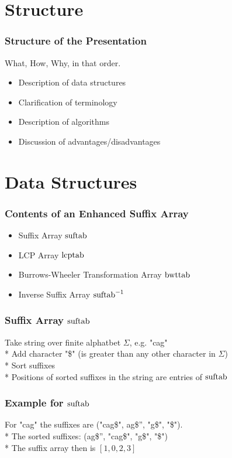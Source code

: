 \documentclass[compress,handout]{beamer} %
\begin{document}
\section{Structure}

\begin{frame}
	\frametitle{Structure of the Presentation}
	What, How, Why, in that order.
	\begin{itemize}
		\item Description of data structures
		\item Clarification of terminology
		\item Description of algorithms
		\item Discussion of advantages/disadvantages
	\end{itemize}
\end{frame}

\section{Data Structures}

\begin{frame}
	\frametitle{Contents of an Enhanced Suffix Array}
	\begin{itemize}
		\item Suffix Array $\hbox{suftab}$
		\item LCP Array $\hbox{lcptab}$
		\item Burrows-Wheeler Transformation Array $\hbox{bwttab}$
		\item Inverse Suffix Array $\hbox{suftab}^{-1}$
	\end{itemize}
\end{frame}

\begin{frame}
	\frametitle{Suffix Array $\hbox{suftab}$}
	Take string over finite alphatbet $\Sigma$, e.g. "cag" \\*
	Add character "\$" (is greater than any other character in $\Sigma$) \\*
	Sort suffixes \\*
	Positions of sorted suffixes in the string are entries of $\hbox{suftab}$
\end{frame}

\begin{frame}
	\frametitle{Example for $\hbox{suftab}$}
	For "cag" the suffixes are ("cag\$", \dq ag\$'', "g\$", "\$"). \\*
	The sorted suffixes: (\dq ag\$'', "cag\$", "g\$", "\$") \\*
	The suffix array then is $[1, 0, 2, 3]$
\end{frame}
\end{document}

